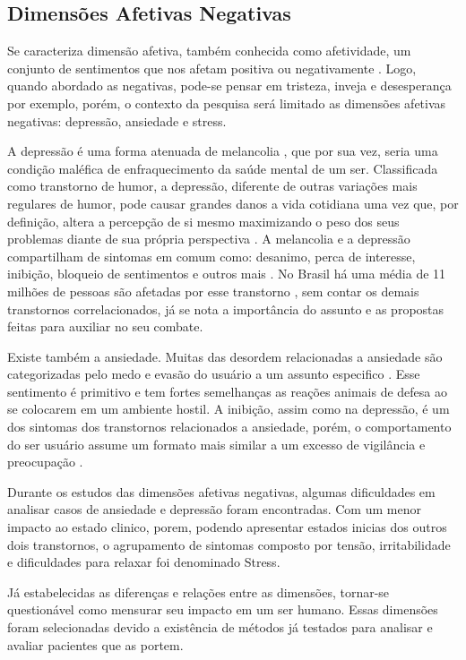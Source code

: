 \subsection{Dimensões Afetivas Negativas}
Se caracteriza dimensão afetiva, também conhecida como afetividade, um conjunto de sentimentos que nos afetam positiva ou negativamente \cite{pinto2009afetos}. Logo, quando abordado as negativas, pode-se pensar em tristeza, inveja e desesperança por exemplo, porém, o contexto da pesquisa será limitado as dimensões afetivas negativas: depressão, ansiedade e stress.

A depressão é uma forma atenuada de melancolia \cite{roudinesco2000psicanalise}, que por sua vez, seria uma condição maléfica de enfraquecimento da saúde mental de um ser. Classificada como transtorno de humor, a depressão, diferente de outras variações mais regulares de humor, pode causar grandes danos a vida cotidiana uma vez que, por definição, altera a percepção de si mesmo maximizando o peso dos seus problemas diante de sua própria perspectiva \cite{esteves2006depressao}. A melancolia e a depressão compartilham de sintomas em comum como: desanimo, perca de interesse, inibição, bloqueio de sentimentos e outros mais \cite[28]{freud2014livro}. No Brasil há uma média de 11 milhões de pessoas são afetadas por esse transtorno \cite{paho2017-letstalk}, sem contar os demais transtornos correlacionados, já se nota a importância do assunto e as propostas feitas para auxiliar no seu combate.

Existe também a ansiedade. Muitas das desordem relacionadas a ansiedade são categorizadas pelo medo e evasão do usuário a um assunto especifico \cite[393]{dsmiv}. Esse sentimento é primitivo e tem fortes semelhanças as reações animais de defesa ao se colocarem em um ambiente hostil. A inibição, assim como na depressão, é um dos sintomas dos transtornos relacionados a ansiedade, porém, o comportamento do ser usuário assume um formato mais similar a um excesso de vigilância e preocupação \cite{margis2003relaccao}.

Durante os estudos das dimensões afetivas negativas, algumas dificuldades em analisar casos de ansiedade e depressão foram encontradas. Com um menor impacto ao estado clinico, porem, podendo apresentar estados inicias dos outros dois transtornos, o agrupamento de sintomas composto por tensão, irritabilidade e dificuldades para relaxar foi denominado Stress. \cite{lovibond1995structure, ribeiro2004contribuiccao, margis2003relaccao}

Já estabelecidas as diferenças e relações entre as dimensões, tornar-se questionável como mensurar seu impacto em um ser humano. Essas dimensões foram selecionadas devido a existência de métodos já testados para analisar e avaliar pacientes que as portem.



